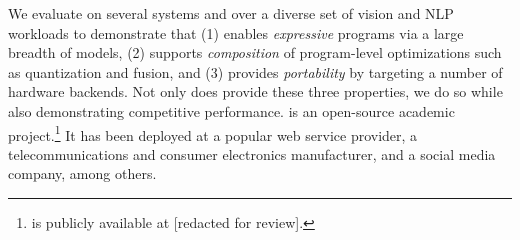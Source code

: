 We evaluate \relay on several systems and over a diverse set of vision and NLP workloads to
  demonstrate that (1) \relay enables \emph{expressive} programs via a large breadth
  of models, (2) \relay supports \emph{composition} of program-level optimizations
  such as quantization and fusion, and (3) \relay provides
  \emph{portability} by targeting a number of hardware backends.
Not only does \relay provide these three properties, we do so while also demonstrating
  competitive performance.
\relay is an open-source academic project.\footnote{\relay is publicly available at [redacted for review].}
  It has been deployed at a popular web service provider,
    a telecommunications and consumer electronics manufacturer,
    and a social media company, among others.
